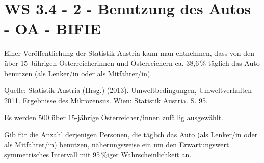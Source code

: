 \section{WS 3.4 - 2 - Benutzung des Autos - OA - BIFIE}

\begin{beispiel}[WS 3.4]{1} %
Einer Veröffentlichung der Statistik Austria kann man entnehmen, dass von den
über 15-Jährigen Österreicherinnen und Österreichern ca. 38,6\,\% täglich das Auto benutzen
(als Lenker/in oder als Mitfahrer/in). 

\tiny
\singlespacing
\begin{flushright}
 Quelle: Statistik Austria (Hrsg.) (2013). Umweltbedingungen, Umweltverhalten 2011. Ergebnisse des Mikrozensus. Wien: Statistik Austria. S. 95.
\end{flushright}

\onehalfspacing 
\normalsize

Es werden 500 über 15-jährige Österreicher/innen zufällig ausgewählt. \leer

Gib für die Anzahl derjenigen Personen, die täglich das Auto (als Lenker/in oder als
Mitfahrer/in) benutzen, näherungsweise ein um den Erwartungswert symmetrisches Intervall mit
95\,\%iger Wahrscheinlichkeit an. 


\end{beispiel} 